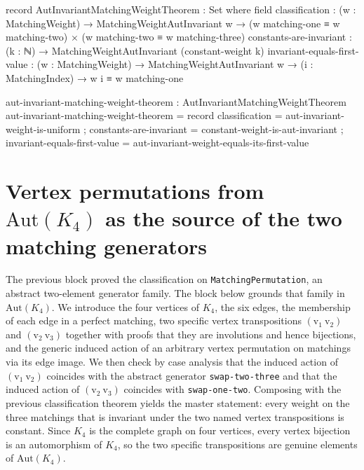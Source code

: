 \documentclass[11pt]{article}
\begin{document}
\begin{code}
record AutInvariantMatchingWeightTheorem : Set where
  field
    classification :
      (w : MatchingWeight) →
      MatchingWeightAutInvariant w →
      (w matching-one ≡ w matching-two) ×
      (w matching-two ≡ w matching-three)
    constants-are-invariant :
      (k : ℕ) → MatchingWeightAutInvariant (constant-weight k)
    invariant-equals-first-value :
      (w : MatchingWeight) →
      MatchingWeightAutInvariant w →
      (i : MatchingIndex) → w i ≡ w matching-one

aut-invariant-matching-weight-theorem :
  AutInvariantMatchingWeightTheorem
aut-invariant-matching-weight-theorem = record
  { classification               = aut-invariant-weight-is-uniform
  ; constants-are-invariant      = constant-weight-is-aut-invariant
  ; invariant-equals-first-value =
      aut-invariant-weight-equals-its-first-value
  }
\end{code}

\section{Vertex permutations from
\texorpdfstring{$\mathrm{Aut}(K_4)$}{Aut(K4)} as the source of the two
matching generators}

The previous block proved the classification on
\texttt{MatchingPermutation}, an abstract two-element generator
family.  The block below grounds that family in
$\mathrm{Aut}(K_4)$.  We introduce the four vertices of $K_4$, the
six edges, the membership of each edge in a perfect matching, two
specific vertex transpositions
$(\mathrm{v_1}\ \mathrm{v_2})$ and $(\mathrm{v_2}\ \mathrm{v_3})$
together with proofs that they are involutions and hence bijections,
and the generic induced action of an arbitrary vertex permutation on
matchings via its edge image.  We then check by case analysis that
the induced action of $(\mathrm{v_1}\ \mathrm{v_2})$ coincides with
the abstract generator \texttt{swap-two-three} and that the induced
action of $(\mathrm{v_2}\ \mathrm{v_3})$ coincides with
\texttt{swap-one-two}.  Composing with the previous classification
theorem yields the master statement: every weight on the three
matchings that is invariant under the two named vertex transpositions
is constant.  Since $K_4$ is the complete graph on four vertices,
every vertex bijection is an automorphism of $K_4$, so the two
specific transpositions are genuine elements of $\mathrm{Aut}(K_4)$.
\end{document}
